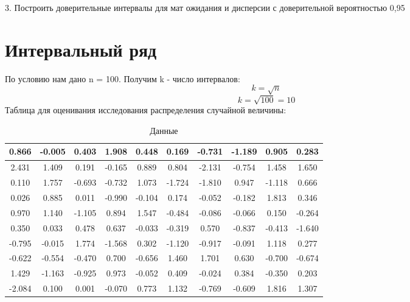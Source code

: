 \documentclass{article}
\begin{document}
3. Построить доверительные интервалы для мат ожидания и дисперсии с доверительной вероятностью 0,95

\section{Интервальный ряд}
По условию нам дано n = 100. Получим k - число интервалов:
\begin{equation}
    k = \sqrt{n}
\end{equation}
\begin{equation*}
    k = \sqrt{100} = 10
\end{equation*}
Таблица для оценивания исследования распределения случайной величины:
\begin{table}[h]
    \centering
    \begin{tabular}{|*{10}{c|}}
        \hline
        0.866 & -0.005 & 0.403 & 1.908 & 0.448 & 0.169 & -0.731 & -1.189 & 0.905 & 0.283 \\
        \hline
        2.431 & 1.409 & 0.191 & -0.165 & 0.889 & 0.804 & -2.131 & -0.754 & 1.458 & 1.650 \\
        \hline
        0.110 & 1.757 & -0.693 & -0.732 & 1.073 & -1.724 & -1.810 & 0.947 & -1.118 & 0.666 \\
        \hline
        0.026 & 0.885 & 0.011 & -0.990 & -0.104 & 0.174 & -0.052 & -0.182 & 1.813 & 0.346 \\
        \hline
        0.970 & 1.140 & -1.105 & 0.894 & 1.547 & -0.484 & -0.086 & -0.066 & 0.150 & -0.264 \\
        \hline
        0.350 & 0.033 & 0.478 & 0.637 & -0.033 & -0.319 & 0.570 & -0.837 & -0.413 & -1.640 \\
        \hline
        -0.795 & -0.015 & 1.774 & -1.568 & 0.302 & -1.120 & -0.917 & -0.091 & 1.118 & 0.277 \\
        \hline
        -0.622 & -0.554 & -0.470 & 0.700 & -0.656 & 1.460 & 1.701 & 0.630 & -0.700 & -0.674 \\
        \hline
        1.429 & -1.163 & -0.925 & 0.973 & -0.052 & 0.409 & -0.024 & 0.384 & -0.350 & 0.203 \\
        \hline
        -2.084 & 0.100 & 0.001 & -0.070 & 0.773 & 1.132 & -0.769 & -0.609 & 1.816 & 1.307 \\
        \hline
    \end{tabular}
    \caption{Данные}
\end{table}
\\
\end{document}
